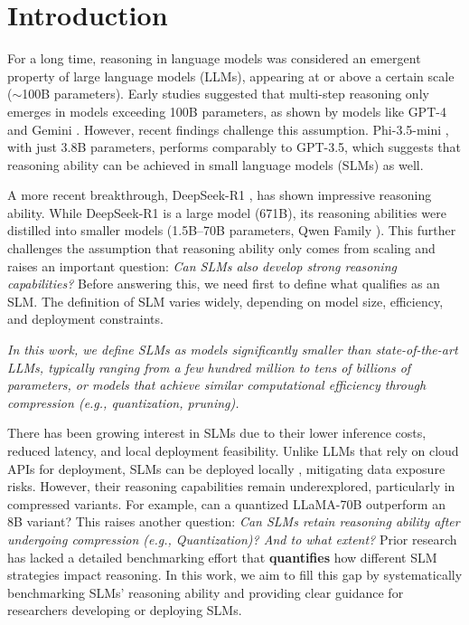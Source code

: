 \section{Introduction}

For a long time, reasoning in language models was considered an emergent property of large language models (LLMs), appearing at or above a certain scale ($\sim$100B parameters). Early studies \cite{wei2022emergentabilitieslargelanguage, chowdhery2022palmscalinglanguagemodeling, NEURIPS2020_1457c0d6} suggested that multi-step reasoning only emerges in models exceeding 100B parameters, as shown by models like GPT-4 \cite{achiam2023gpt} and Gemini \cite{geminiteam2024geminifamilyhighlycapable}. However, recent findings challenge this assumption. Phi-3.5-mini \cite{abdin2024phi}, with just 3.8B parameters, performs comparably to GPT-3.5, which suggests that reasoning ability can be achieved in small language models (SLMs) as well. 

A more recent breakthrough, DeepSeek-R1 \cite{deepseekai2025deepseekr1incentivizingreasoningcapability}, has shown impressive reasoning ability. While DeepSeek-R1 is a large model (671B), its reasoning abilities were distilled into smaller models (1.5B–70B parameters, Qwen Family \cite{qwen2025qwen25technicalreport}). This further challenges the assumption that reasoning ability only comes from scaling and raises an important question: \textit{Can SLMs also develop strong reasoning capabilities?} Before answering this, we need first to define what qualifies as an SLM. The definition of SLM varies widely, depending on model size, efficiency, and deployment constraints.


\begin{testexample}
\textit{In this work, we define SLMs as models significantly smaller than state-of-the-art LLMs, typically ranging from a few hundred million to tens of billions of parameters, or models that achieve similar computational efficiency through compression (e.g., quantization, pruning).}
\end{testexample}

There has been growing interest in SLMs due to their lower inference costs, reduced latency, and local deployment feasibility. Unlike LLMs that rely on cloud APIs for deployment, SLMs can be deployed locally \cite{wang2024comprehensive}, mitigating data exposure risks. However, their reasoning capabilities remain underexplored, particularly in compressed \cite{zhu2024survey} variants. For example, can a quantized LLaMA-70B outperform an 8B variant? This raises another question: \textit{Can SLMs retain reasoning ability after undergoing compression (e.g., Quantization)? And to what extent?} Prior research has lacked a detailed benchmarking effort that \textbf{quantifies} how different SLM strategies impact reasoning. In this work, we aim to fill this gap by systematically benchmarking SLMs' reasoning ability and providing clear guidance for researchers developing or deploying SLMs. 

